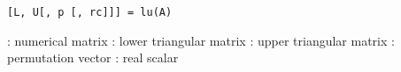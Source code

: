 
\begin{mandesc}
\end{mandesc}

\begin{calling_sequence}
\begin{verbatim}
[L, U[, p [, rc]]] = lu(A)
\end{verbatim}
\end{calling_sequence}
\begin{parameters}
  \begin{varlist}
    :  numerical matrix
    : lower triangular matrix 
    : upper triangular matrix
    : permutation vector
    : real scalar
  \end{varlist}
\end{parameters}

